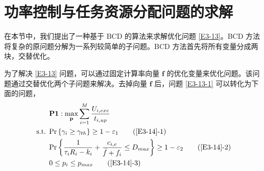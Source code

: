 \section{功率控制与任务资源分配问题的求解}\label{section3-3}
在本节中，我们提出了一种基于 BCD 的算法来求解优化问题 \eqref{E3-13}。BCD 方法将复杂的原问题分解为一系列较简单的子问题。BCD 方法首先将所有变量分成两块，交替优化。

为了解决 \eqref{E3-13} 问题，可以通过固定计算率向量 $\mathbf{f}$ 的优化变量来优化问题。该问题通过交替优化两个子问题来解决。去掉向量 $\mathbf{f}$ 后，问题 \eqref{E3-13-1} 可以转化为下面的问题，
\begin{align}
& \textbf{P1}:\max\limits_{\mathbf{p}}\sum_{i=1}^{M}\frac{U_{i,exe}}{t_{i,up}}                                  \label{E3-14}\\
\text { s.t. }
& \textrm{Pr}\left\{\gamma_i\geq\gamma_{th}\right\}\geq1-\varepsilon_1                                         \tag{\ref{E3-14}{-1}}      \label{E3-14-1}\\  %
& \textrm{Pr}\left\{\frac{1}{\tau_iR_i-k_i}+\frac{c_{i,e}}{\bar{f}+f_i}\le D_{max}\right\}\geq1-\varepsilon_2  \tag{\ref{E3-14}{-2}}      \label{E3-14-2}\\  %
& 0\le p_i\le p_{max}                                                                                          \tag{\ref{E3-14}{-3}}      \label{E3-14-3}  %
\end{align}

